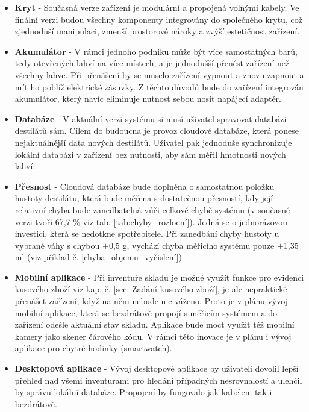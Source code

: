 \begin{itemize}
    \item \textbf{Kryt} - Současná verze zařízení je modulární a propojená volnými kabely. Ve finální verzi budou všechny komponenty integrovány do společného krytu, což zjednoduší manipulaci, zmenší prostorové nároky a zvýší estetičnost zařízení.
    
    \item \textbf{Akumulátor} - V rámci jednoho podniku může být více samostatných barů, tedy otevřených lahví na více místech, a je jednodušší přenést zařízení než všechny lahve. Při přenášení by se muselo zařízení vypnout a znovu zapnout a mít ho poblíž elektrické zásuvky. Z těchto důvodů bude do zařízení integrován akumulátor, který navíc eliminuje nutnost sebou nosit napájecí adaptér.

    \item \textbf{Databáze} - V aktuální verzi systému si musí uživatel spravovat databázi destilátů sám. Cílem do budoucna je provoz cloudové databáze, která ponese nejaktuálnější data nových destilátů. Uživatel pak jednoduše synchronizuje lokální databázi v zařízení bez nutnosti, aby sám měřil hmotnosti nových lahví.
    \item \textbf{Přesnost} - Cloudová databáze bude doplněna o samostatnou položku hustoty destilátu, která bude měřena s dostatečnou přesností, kdy její relativní chyba bude zanedbatelná vůči celkové chybě systému (v současné verzi tvoří 67,7 \% viz tab. \ref{tab:chyby_rozloení}). Jedná se o jednorázovou investici, která se nedotkne spotřebitele. Při zanedbání chyby hustoty u vybrané váhy s chybou $\pm$0,5 g, vychází chyba měřicího systému pouze $\pm$1,35 ml (viz příklad č. \ref{chyba_objemu_vyčislení})

    \item \textbf{Mobilní aplikace} - Při inventuře skladu je možné využít funkce pro evidenci kusového zboží viz kap. č. \ref{sec: Zadání kusového zboží}, je ale nepraktické přenášet zařízení, když na něm nebude nic váženo. Proto je v plánu vývoj mobilní aplikace, která se bezdrátově propojí s měřicím systémem a do zařízení odešle aktuální stav skladu. Aplikace bude moct využit též mobilní kamery jako skener čárového kódu. V rámci této inovace je v plánu i vývoj aplikace pro chytré hodinky (smartwatch).

    \item \textbf{Desktopová aplikace} - Vývoj desktopové aplikace by uživateli dovolil lepší přehled nad všemi inventurami pro hledání případných nesrovnalostí a ulehčil by správu lokální databáze. Propojení by fungovalo jak kabelem tak i bezdrátově.


\end{itemize}
